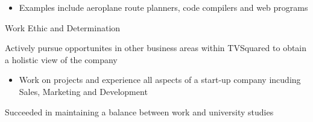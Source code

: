 \begin{cventries}
{\begin{cvitems}
       	\begin{itemize}
      	 \item Examples include aeroplane route planners, code compilers and web programs
      	 \end{itemize}
      \end{cvitems}
      }
    \cventry          
    {Work Ethic and Determination}
    {}
    {}
    {}
    {
      \begin{cvitems}
      \item {Actively pursue opportunites in other business areas within TVSquared to obtain a holistic view of the company}
      		       \vspace{1mm}
		\begin{itemize}
      		\item Work on projects and experience all aspects of a start-up company incuding Sales, Marketing and Development
      		\end{itemize}
      \item {Succeeded in maintaining a balance between work and university studies}
      \end{cvitems}
      }
\end{cventries}